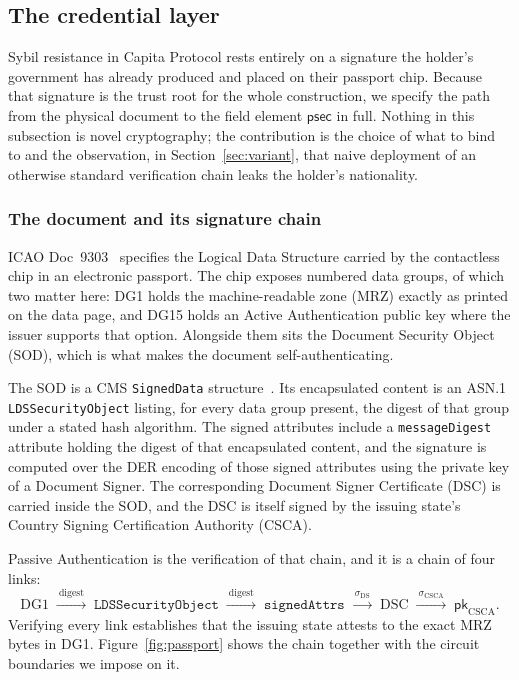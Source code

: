 \documentclass[11pt,a4paper]{article}
\theoremstyle{definition}
\theoremstyle{plain}
\theoremstyle{remark}
\newcommand{\psec}{\ensuremath{\mathsf{psec}}}
\begin{document}
\subsection{The credential layer}
\label{sec:identity}

Sybil resistance in Capita Protocol rests entirely on a signature the holder's government has already produced and placed on their passport chip. Because that signature is the trust root for the whole construction, we specify the path from the physical document to the field element $\psec$ in full. Nothing in this subsection is novel cryptography; the contribution is the choice of what to bind to and the observation, in Section~\ref{sec:variant}, that naive deployment of an otherwise standard verification chain leaks the holder's nationality.

\subsubsection{The document and its signature chain}
\label{sec:icao}

ICAO Doc~9303~\cite{icao9303} specifies the Logical Data Structure carried by the contactless chip in an electronic passport. The chip exposes numbered data groups, of which two matter here: DG1 holds the machine-readable zone (MRZ) exactly as printed on the data page, and DG15 holds an Active Authentication public key where the issuer supports that option. Alongside them sits the Document Security Object (SOD), which is what makes the document self-authenticating.

The SOD is a CMS \texttt{SignedData} structure~\cite{rfc5652}. Its encapsulated content is an ASN.1 \texttt{LDSSecurityObject} listing, for every data group present, the digest of that group under a stated hash algorithm. The signed attributes include a \texttt{messageDigest} attribute holding the digest of that encapsulated content, and the signature is computed over the DER encoding of those signed attributes using the private key of a Document Signer. The corresponding Document Signer Certificate (DSC) is carried inside the SOD, and the DSC is itself signed by the issuing state's Country Signing Certification Authority (CSCA).

Passive Authentication is the verification of that chain, and it is a chain of four links:
\[
\mathrm{DG1}
\;\xrightarrow{\ \text{digest}\ }\;
\texttt{LDSSecurityObject}
\;\xrightarrow{\ \text{digest}\ }\;
\texttt{signedAttrs}
\;\xrightarrow{\ \sigma_{\mathrm{DS}}\ }\;
\mathrm{DSC}
\;\xrightarrow{\ \sigma_{\mathrm{CSCA}}\ }\;
\mathsf{pk}_{\mathrm{CSCA}}.
\]
Verifying every link establishes that the issuing state attests to the exact MRZ bytes in DG1. Figure~\ref{fig:passport} shows the chain together with the circuit boundaries we impose on it.
\end{document}
